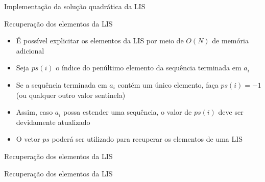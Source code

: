\begin{frame}[fragile]{Implementação da solução quadrática da LIS}
\end{frame}

\begin{frame}[fragile]{Recuperação dos elementos da LIS}

    \begin{itemize}
        \item É possível explicitar os elementos da LIS por meio de $O(N)$ de memória
            adicional

        \item Seja $ps(i)$ o índice do penúltimo elemento da sequência terminada em
            $a_i$

        \item Se a sequência terminada em $a_i$ contém um único elemento, faça
            $ps(i) = -1$ (ou qualquer outro valor sentinela)

        \item Assim, caso $a_i$ possa estender uma sequência, o valor de $ps(i)$ deve
            ser devidamente atualizado

        \item O vetor $ps$ poderá ser utilizado para recuperar os elementos de uma LIS
    \end{itemize}

\end{frame}

\begin{frame}[fragile]{Recuperação dos elementos da LIS}
\end{frame}

\begin{frame}[fragile]{Recuperação dos elementos da LIS}
\end{frame}
